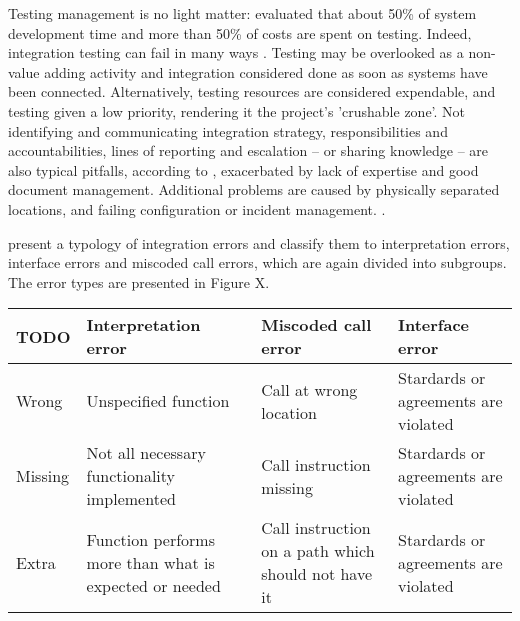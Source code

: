 \documentclass[12pt,a4paper,oneside,pdftex]{report}
\begin{document}
{{Testing management is no light matter: \citet{reid2005art} evaluated that about 50\% of system development time and more than 50\% of costs are spent on testing. Indeed, integration testing can fail in many ways \citep{van2008identifying}. Testing may be overlooked as a non-value adding activity and integration considered done as soon as systems have been connected. Alternatively, testing resources are considered expendable, and testing given a low priority, rendering it the project's 'crushable zone'. Not identifying and communicating integration strategy, responsibilities and accountabilities, lines of reporting and escalation -- or sharing knowledge -- are also typical pitfalls, according to \citet{van2008identifying}, exacerbated by lack of expertise and good document management. Additional problems are caused by physically separated locations, and failing configuration or incident management. \citep{van2008identifying}.

\citet{leung1990study} present a typology of integration errors and classify them to interpretation errors, interface errors and miscoded call errors, which are again divided into subgroups. The error types are presented in Figure X.

\begin{center}
    \begin{tabular}{ | l | p{3cm} | p{3cm} | p{3cm} |}
    \hline
    TODO & Interpretation error & Miscoded call error & Interface error \\ \hline
    Wrong & Unspecified function & Call at wrong location & Stardards or agreements are violated \\ \hline
    Missing & Not all necessary functionality implemented & Call instruction missing & Stardards or agreements are       violated \\ 
    \hline
    Extra & Function performs more than what is expected or needed & Call instruction on a path which should not have it & Stardards or agreements are violated \\
    \hline
    \end{tabular}
\end{center}

\begin{comment}
Interpretation
    wrong function - something else than specified
    extra function - more than what is expected/needed
    missing function - not all that is specified
Miscoded call (error which causes the developer to place the call instruction at the wrong point in the program)
    Extra instruction fault: the call instruction is on a path which should not have the call.
    Wrong placement fault: the call is at the wrong location on the path which should have the call instruction.
    Missing instruction fault: the call instruction is missing on the path which should have the call.
Interface error
    When stardards or agreements are violated
\end{comment}

}}
\end{document}
